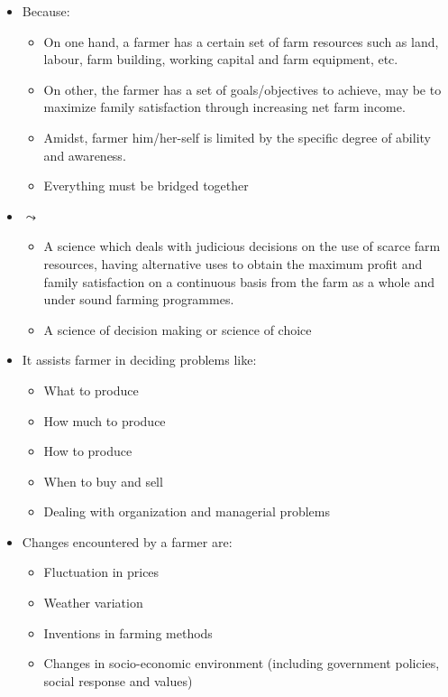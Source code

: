\documentclass[12pt,ignorenonframetext,aspectratio=169]{beamer}
\providecommand{\tightlist}{%
  \setlength{\itemsep}{0pt}\setlength{\parskip}{0pt}}
\begin{document}
\begin{frame}{}
\protect\hypertarget{section}{}
\begin{itemize}
\tightlist
\item
  Because:

  \begin{itemize}
  \tightlist
  \item
    On one hand, a farmer has a certain set of farm resources such as
    land, labour, farm building, working capital and farm equipment,
    etc.
  \item
    On other, the farmer has a set of goals/objectives to achieve, may
    be to maximize family satisfaction through increasing net farm
    income.
  \item
    Amidst, farmer him/her-self is limited by the specific degree of
    ability and awareness.
  \item
    Everything must be bridged together
  \end{itemize}
\item
  \(\leadsto\)

  \begin{itemize}
  \tightlist
  \item
    A science which deals with judicious decisions on the use of scarce
    farm resources, having alternative uses to obtain the maximum profit
    and family satisfaction on a continuous basis from the farm as a
    whole and under sound farming programmes.
  \item
    A science of decision making or science of choice
  \end{itemize}
\end{itemize}
\end{frame}

\begin{frame}{}
\protect\hypertarget{section-1}{}
\begin{itemize}
\tightlist
\item
  It assists farmer in deciding problems like:

  \begin{itemize}
  \tightlist
  \item
    What to produce
  \item
    How much to produce
  \item
    How to produce
  \item
    When to buy and sell
  \item
    Dealing with organization and managerial problems
  \end{itemize}
\item
  Changes encountered by a farmer are:

  \begin{itemize}
  \tightlist
  \item
    Fluctuation in prices
  \item
    Weather variation
  \item
    Inventions in farming methods
  \item
    Changes in socio-economic environment (including government
    policies, social response and values)
  \end{itemize}
\end{itemize}
\end{frame}
\end{document}
